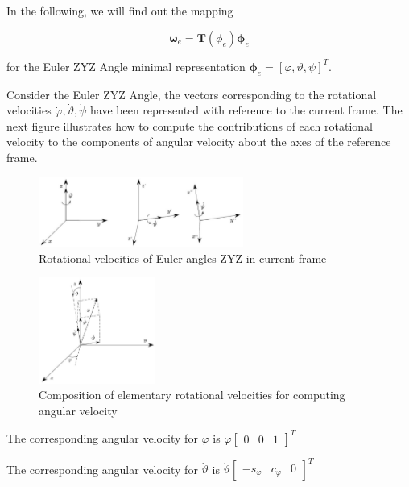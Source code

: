 \documentclass[10pt]{article}
\begin{document}
In the following, we will find out the mapping 

$$
\boldsymbol{\omega}_{e}=\boldsymbol{T}\left(\phi_{e}\right)\dot{\boldsymbol{\phi}}_{e}
$$

for the Euler ZYZ Angle minimal representation ${\boldsymbol{\phi}}_{e}=[{\varphi}, {\vartheta}, \psi]^T$.


Consider the Euler  ZYZ Angle, the vectors corresponding to the rotational velocities $\dot{\varphi}, \dot{\vartheta}, \dot\psi$ have been represented with reference to the current frame. The next figure illustrates how to compute the contributions of each rotational velocity to the components of angular velocity about the axes of the reference frame.

\begin{figure}[H]
    \centering
    \includegraphics[max width=0.6\textwidth]{diff_kinematics/Euler_angle_vel.jpg}
    \caption{Rotational velocities of Euler angles ZYZ in current frame}
    \label{fig:enter-label}
\end{figure}



\begin{figure}[H]
    \centering
    \includegraphics[max width=0.34\textwidth]{diff_kinematics/Euler_angle_vel_to_angular_vel}
    \caption{Composition of elementary rotational velocities for computing angular velocity}
    \label{fig:enter-label}
\end{figure}




The corresponding angular velocity for $\dot{\varphi}$ is $\dot{\varphi}\left[\begin{array}{lll}0 & 0 & 1\end{array}\right]^{T}$

The corresponding angular velocity for   $\dot{\vartheta}$ is  $\dot{\vartheta}\left[\begin{array}{lll}-s_{\varphi} & c_{\varphi} & 0\end{array}\right]^{T}$ 
  
\end{document}
